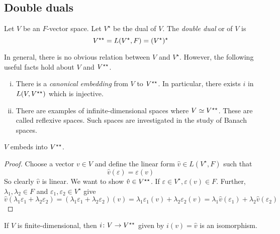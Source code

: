 \subsection{Double duals}
\begin{definition}
	Let \( V \) be an \( F \)-vector space.
	Let \( V^\star \) be the dual of \( V \).
	The \textit{double dual} or  of \( V \) is
	\[
		V^{\star\star} = L(V^\star, F) = (V^\star)^\star
	\]
\end{definition}
\begin{remark}
	In general, there is no obvious relation between \( V \) and \( V^\star \).
	However, the following useful facts hold about \( V \) and \( V^{\star\star} \).
	\begin{enumerate}[(i)]
		\item There is a \textit{canonical embedding} from \( V \) to \( V^{\star\star} \).
		      In particular, there exists \( i \) in \( L(V, V^{\star\star}) \) which is injective.
		\item There are examples of infinite-dimensional spaces where \( V \simeq V^{\star\star} \).
		      These are called reflexive spaces.
		      Such spaces are investigated in the study of Banach spaces.
	\end{enumerate}
\end{remark}
\begin{theorem}
	\( V \) embeds into \( V^{\star\star} \).
\end{theorem}
\begin{proof}
	Choose a vector \( v \in V \) and define the linear form \( \hat v \in L(V^\star, F) \) such that
	\[
		\hat v(\varepsilon) = \varepsilon(v)
	\]
	So clearly \( \hat v \) is linear.
	We want to show \( \hat v \in V^{\star\star} \).
	If \( \varepsilon \in V^\star, \varepsilon(v) \in F \).
	Further, \( \lambda_1, \lambda_2 \in F \) and \( \varepsilon_1, \varepsilon_2 \in V^\star \) give
	\[
		\hat v (\lambda_1 \varepsilon_1 + \lambda_2 \varepsilon_2) = (\lambda_1 \varepsilon_1 + \lambda_2 \varepsilon_2)(v) = \lambda_1 \varepsilon_1(v) + \lambda_2 \varepsilon_2(v) = \lambda_1 \hat v(\varepsilon_1) + \lambda_2 \hat v(\varepsilon_2)
	\]
\end{proof}
\begin{theorem}
	If \( V \) is finite-dimensional, then \( i \colon V \to V^{\star\star} \) given by \( i(v) = \hat v \) is an isomorphism.
\end{theorem}

